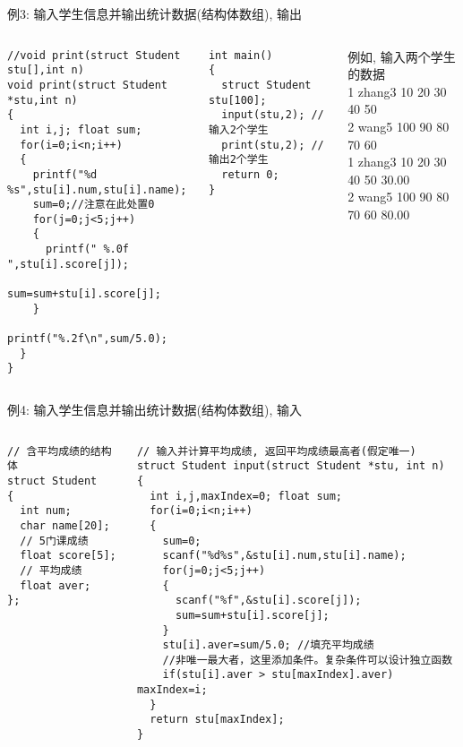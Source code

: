 \begin{frame}{例3: 输入学生信息并输出统计数据(结构体数组), 输出}
\begin{columns}[T]
\begin{lstlisting}
//void print(struct Student stu[],int n)
void print(struct Student *stu,int n)
{
  int i,j; float sum;
  for(i=0;i<n;i++)
  {
    printf("%d %s",stu[i].num,stu[i].name);
    sum=0;//注意在此处置0
    for(j=0;j<5;j++)
    { 
      printf(" %.0f ",stu[i].score[j]);
      sum=sum+stu[i].score[j];
    }
    printf("%.2f\n",sum/5.0);
  }
}
\end{lstlisting}
\begin{lstlisting}
int main()
{ 
  struct Student stu[100];
  input(stu,2); // 输入2个学生
  print(stu,2); // 输出2个学生
  return 0;
}
\end{lstlisting}
例如, 输入两个学生的数据\\
1 zhang3 10 20 30 40 50\\
2 wang5 100 90 80 70 60\\
1 zhang3 10  20  30  40  50 30.00\\
2 wang5 100  90  80  70  60 80.00
\end{columns}
\medskip
\end{frame}

\begin{frame}{例4: 输入学生信息并输出统计数据(结构体数组), 输入}
\begin{columns}[T]
\begin{lstlisting}
// 含平均成绩的结构体
struct Student 
{ 
  int num;
  char name[20];
  // 5门课成绩
  float score[5];
  // 平均成绩
  float aver;
};
\end{lstlisting}
\begin{lstlisting}
// 输入并计算平均成绩, 返回平均成绩最高者(假定唯一)
struct Student input(struct Student *stu, int n)
{
  int i,j,maxIndex=0; float sum;
  for(i=0;i<n;i++) 
  {
    sum=0;
    scanf("%d%s",&stu[i].num,stu[i].name);
    for(j=0;j<5;j++)
    { 
      scanf("%f",&stu[i].score[j]);
      sum=sum+stu[i].score[j];
    }
    stu[i].aver=sum/5.0; //填充平均成绩
    //非唯一最大者，这里添加条件。复杂条件可以设计独立函数
    if(stu[i].aver > stu[maxIndex].aver) maxIndex=i;
  } 
  return stu[maxIndex];
}
\end{lstlisting}
\end{columns}
\medskip
\end{frame}

